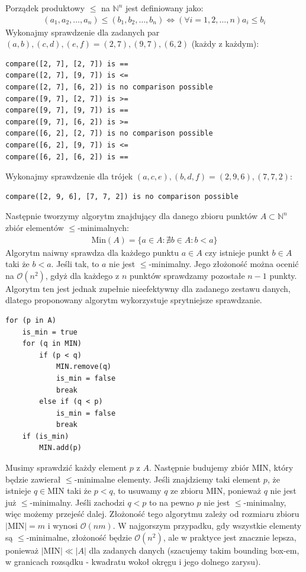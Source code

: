 \documentclass[12pt, a4paper]{article}
\begin{document}
Porządek produktowy $\leq$ na $\mathbb{N}^n$ jest definiowany jako:
\begin{align*}
    (a_1, a_2, \dots, a_n) \leq (b_1, b_2, \dots, b_n) \iff \left(\forall i = 1,2,\dots, n \right) a_i \leq b_i 
\end{align*}
Wykonajmy sprawdzenie dla zadanych par $(a,b),(c,d),(e,f)=(2,7),(9,7),(6,2)$ (każdy z każdym):
\begin{verbatim}
compare([2, 7], [2, 7]) is ==
compare([2, 7], [9, 7]) is <=
compare([2, 7], [6, 2]) is no comparison possible
compare([9, 7], [2, 7]) is >=
compare([9, 7], [9, 7]) is ==
compare([9, 7], [6, 2]) is >=
compare([6, 2], [2, 7]) is no comparison possible
compare([6, 2], [9, 7]) is <=
compare([6, 2], [6, 2]) is ==
\end{verbatim}
Wykonajmy sprawdzenie dla trójek $(a,c,e),(b,d,f)=(2,9,6),(7,7,2)$:
\begin{verbatim}
compare([2, 9, 6], [7, 7, 2]) is no comparison possible
\end{verbatim}
Następnie tworzymy algorytm znajdujący dla danego zbioru punktów $A \subset \mathbb{N}^n$ zbiór elementów $\leq$-minimalnych:
\begin{align*}
    \text{Min}(A) = \{ a \in A : \nexists b \in A : b < a \}
\end{align*}
Algorytm naiwny sprawdza dla każdego punktu $a \in A$ czy istnieje punkt $b \in A$ taki że $b < a$. Jeśli tak, to $a$ nie jest $\leq$-minimalny.
Jego złożoność można ocenić na $\mathcal{O}(n^2)$, gdyż dla każdego z $n$ punktów sprawdzamy pozostałe $n-1$ punkty. 
Algorytm ten jest jednak zupełnie nieefektywny dla zadanego zestawu danych, dlatego proponowany algorytm wykorzystuje sprytniejsze sprawdzanie.
\begin{verbatim}
for (p in A) 
    is_min = true
    for (q in MIN)
        if (p < q)
            MIN.remove(q)
            is_min = false
            break
        else if (q < p)
            is_min = false
            break
    if (is_min)
        MIN.add(p)
\end{verbatim}
Musimy sprawdzić każdy element $p$ z $A$. Następnie budujemy zbiór $\text{MIN}$, który będzie zawierał $\leq$-minimalne elementy. 
Jeśli znajdziemy taki element $p$, że istnieje $q \in \text{MIN}$ taki że $p < q$, to usuwamy $q$ ze zbioru $\text{MIN}$, ponieważ $q$ nie jest już $\leq$-minimalny.
Jeśli zachodzi $q < p$ to na pewno $p$ nie jest $\leq$-minimalny, więc możemy przejeść dalej.
Złożoność tego algorytmu zależy od rozmiaru zbioru $|\text{MIN}|=m$ i wynosi $\mathcal{O}(nm)$. W najgorszym przypadku, gdy wszystkie elementy są $\leq$-minimalne, złożoność będzie $\mathcal{O}(n^2)$,
ale w praktyce jest znacznie lepsza, ponieważ $|\text{MIN}| \ll |A|$ dla zadanych danych (szacujemy takim bounding box-em, 
w granicach rozsądku - kwadratu wokoł okręgu i jego dolnego zarysu).
\end{document}
